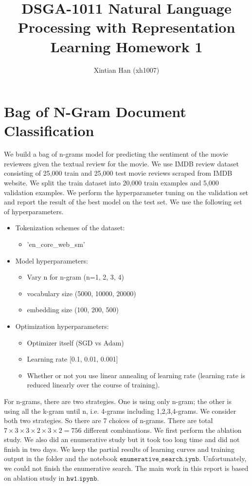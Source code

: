 \documentclass[10pt,a4paper]{article}
\title{DSGA-1011 Natural Language Processing with Representation Learning Homework 1
}
\author{Xintian Han (xh1007)}
\begin{document}
\maketitle
\section{Bag of N-Gram Document Classification} 
We build a bag of n-grams model for predicting the sentiment of the movie reviewers given the textual review for the movie. We use IMDB review dataset consisting of 25,000 train and 25,000 test movie reviews scraped from IMDB website. We split the train dataset into 20,000 train examples and 5,000 validation examples. We perform the hyperparameter tuning on the validation set and report the result of the best model on the test set. We use the following set of hyperparameters.
\begin{itemize}
\item Tokenization schemes of the dataset: 
\begin{itemize}
\item 'en\_core\_web\_sm'	
\end{itemize}
\item Model hyperparameters:
\begin{itemize}
\item Vary n for n-gram (n=1, 2, 3, 4)
\item vocabulary size (5000, 10000, 20000)
\item embedding size (100, 200, 500)
\end{itemize}
\item Optimization hyperparameters:
\begin{itemize}
\item Optimizer itself (SGD vs Adam)
\item Learning rate [0.1, 0.01, 0.001]
\item Whether or not you use linear annealing of learning rate (learning rate is reduced linearly over the course of training).	
\end{itemize}
\end{itemize}
For n-grams, there are two strategies. One is using only n-gram; the other is using all the k-gram until n, i.e. 4-grams including 1,2,3,4-grams. We consider both two strategies. So there are 7 choices of n-grams. There are total $7\times 3 \times 3\times 2 \times 3 \times 2 = 756$ different combinations. We first perform the ablation study. We also did an enumerative study but it took too long time and did not finish in two days. We keep the partial results of learning curves and training output in the folder and the notebook $\texttt{enumerative\_search.iynb}$. Unfortunately, we could not finish the enumerative search. The main work in this report is based on ablation study in $\texttt{hw1.ipynb}$.
\end{document}
